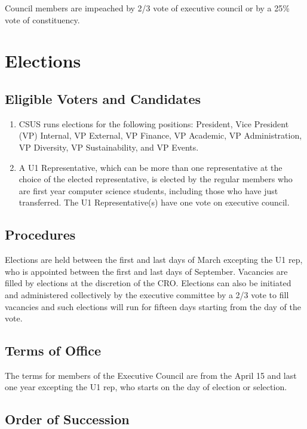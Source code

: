 Council members are impeached by 2/3 vote of executive council or by a
25\% vote of constituency.

\section{Elections}\label{elections}

\subsection{Eligible Voters and
Candidates}\label{eligible-voters-and-candidates}

\begin{enumerate}
\def\labelenumi{\arabic{enumi}.}
\item
  CSUS runs elections for the following positions: President, Vice
  President (VP) Internal, VP External, VP Finance, VP Academic, VP
  Administration, VP Diversity, VP Sustainability, and VP Events.
\item
  A U1 Representative, which can be more than one representative at the
  choice of the elected representative, is elected by the regular
  members who are first year computer science students, including those
  who have just transferred. The U1 Representative(s) have one vote on
  executive council.
\end{enumerate}

\subsection{Procedures}\label{procedures}

Elections are held between the first and last days of March excepting
the U1 rep, who is appointed between the first and last days of
September. Vacancies are filled by elections at the discretion of the
CRO. Elections can also be initiated and administered collectively by
the executive committee by a 2/3 vote to fill vacancies and such
elections will run for fifteen days starting from the day of the vote.

\subsection{Terms of Office}\label{terms-of-office}

The terms for members of the Executive Council are from the April 15 and
last one year excepting the U1 rep, who starts on the day of election or
selection.

\subsection{Order of Succession}\label{order-of-succession}

